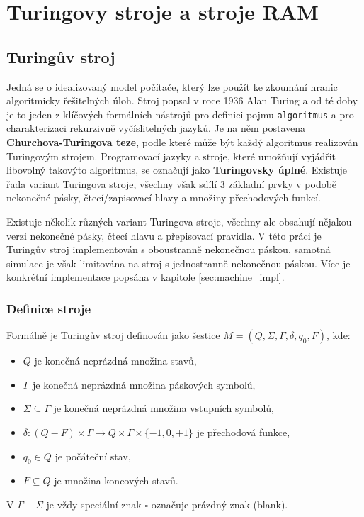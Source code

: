 \chapter{Turingovy stroje a stroje RAM}
\label{sec:theory}

\section{Turingův stroj}
Jedná se o idealizovaný model počítače, který lze použít ke zkoumání hranic algoritmicky řešitelných úloh. 
Stroj popsal v roce 1936 Alan Turing a od té doby je to jeden z klíčových formálních nástrojů pro
 definici pojmu \texttt{algoritmus} a pro charakterizaci rekurzivně vyčíslitelných jazyků. %
Je na něm postavena \textbf{Churchova-Turingova teze}, podle které může být každý algoritmus realizován Turingovým strojem. 
Programovací jazyky a stroje, které umožňují vyjádřit libovolný takovýto algoritmus, se označují jako \textbf{Turingovsky úplné}. %
Existuje řada variant Turingova stroje, všechny však sdílí 3 základní prvky v podobě nekonečné pásky, čtecí/zapisovací hlavy a množiny přechodových funkcí.

Existuje několik různých variant Turingova stroje, všechny ale obsahují nějakou verzi nekonečné pásky, čtecí hlavu a přepisovací pravidla.
V této práci je Turingův stroj implementován s oboustranně nekonečnou páskou, samotná simulace je však limitována na stroj s jednostranně nekonečnou páskou. 
Více je konkrétní implementace popsána v kapitole \ref{sec:machine_impl}.

\subsection{Definice stroje}
Formálně je Turingův stroj definován jako šestice $M = (Q, \Sigma, \Gamma, \delta, q_0, F)$, kde: %
\begin{itemize}
	\item $Q$ je konečná neprázdná množina stavů,
	\item $\Gamma$ je konečná neprázdná množina páskových symbolů,
	\item $\Sigma \subseteq \Gamma$ je konečná neprázdná množina vstupních symbolů,
	\item $\delta : (Q - F) \times \Gamma \rightarrow Q \times \Gamma \times \{-1, 0, +1\}$ je přechodová funkce,
	\item $q_0 \in Q$ je počáteční stav,
	\item $F \subseteq Q$ je množina koncových stavů.
\end{itemize}
V $\Gamma - \Sigma$ je vždy speciální znak $\square$ označuje prázdný znak (blank).

